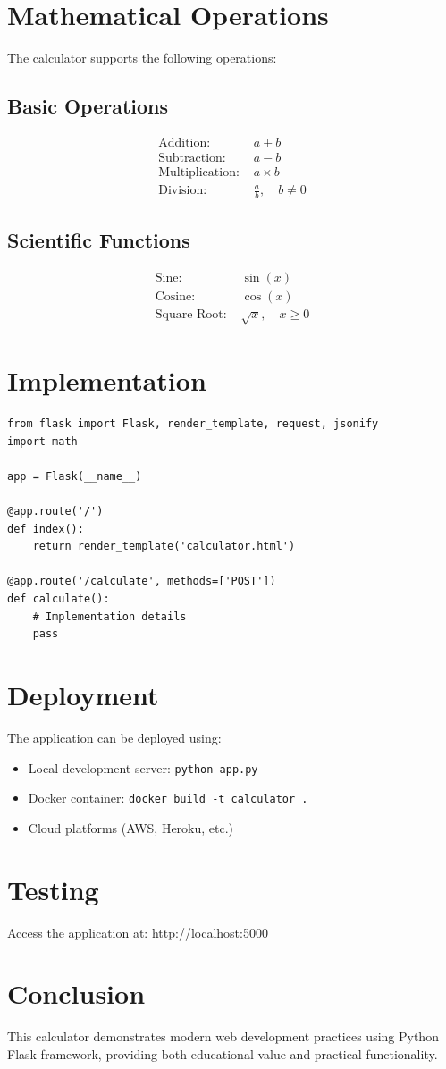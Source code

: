 \documentclass[12pt,a4paper]{article}
\begin{document}
\section{Mathematical Operations}
The calculator supports the following operations:

\subsection{Basic Operations}
\begin{align}
    \text{Addition: } & a + b \\
    \text{Subtraction: } & a - b \\
    \text{Multiplication: } & a \times b \\
    \text{Division: } & \frac{a}{b}, \quad b \neq 0
\end{align}

\subsection{Scientific Functions}
\begin{align}
    \text{Sine: } & \sin(x) \\
    \text{Cosine: } & \cos(x) \\
    \text{Square Root: } & \sqrt{x}, \quad x \geq 0
\end{align}

\section{Implementation}
\begin{lstlisting}[caption=Flask Application Structure]
from flask import Flask, render_template, request, jsonify
import math

app = Flask(__name__)

@app.route('/')
def index():
    return render_template('calculator.html')

@app.route('/calculate', methods=['POST'])
def calculate():
    # Implementation details
    pass
\end{lstlisting}

\section{Deployment}
The application can be deployed using:
\begin{itemize}
    \item Local development server: \texttt{python app.py}
    \item Docker container: \texttt{docker build -t calculator .}
    \item Cloud platforms (AWS, Heroku, etc.)
\end{itemize}

\section{Testing}
Access the application at: \url{http://localhost:5000}

\section{Conclusion}
This calculator demonstrates modern web development practices using Python Flask framework, providing both educational value and practical functionality.
\end{document}
